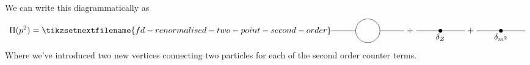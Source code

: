 \documentclass[fleqn]{NotesClass}
\begin{document}
    We can write this diagrammatically as
    \begin{equation}
        \Pi(p^2) = 
        \tikzsetnextfilename{fd-renormalised-two-point-second-order}
        \begin{tikzpicture}[baseline = (plus.base)]
            \draw (-1.5, 0) -- (-0.5, 0);
            \draw (0, 0) circle [radius = 0.5];
            \draw (0.5, 0) -- (1.5, 0);
            \node (plus) at (1.75, 0) {\(+\)};
            \draw (2, 0) -- (4, 0);
            \node (plus) at (4.25, 0) {\(+\)};
            \draw (4.5, 0) -- (6.5, 0);
            \fill (3, 0) circle [radius = 0.08] node [below] {\(\delta_Z\)};
            \fill (5.5, 0) circle [radius = 0.08] node [below] {\(\delta_{m^2}\)};
        \end{tikzpicture}
    \end{equation}
    Where we've introduced two new vertices connecting two particles for each of the second order counter terms.
    
\end{document}
